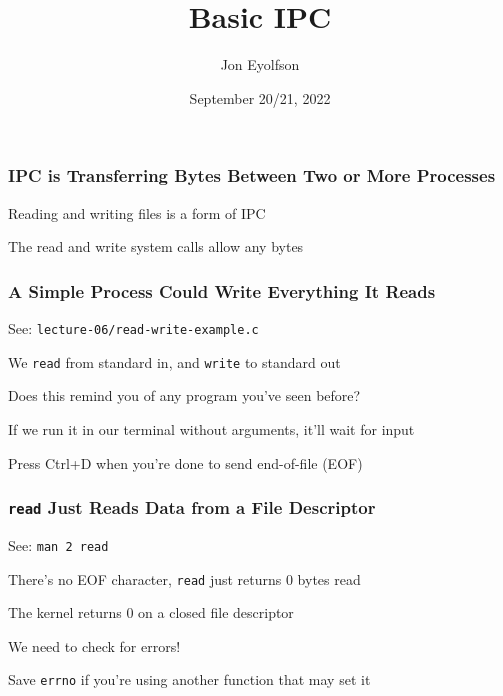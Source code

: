 

\title{Basic IPC}
\author{Jon Eyolfson}
\date{September 20/21, 2022}


  \begin{frame}
    \titlepage
  \end{frame}

  \begin{frame}
    \frametitle{IPC is Transferring Bytes Between Two or More Processes}

    Reading and writing files is a form of IPC

    \vspace{2em}

    The read and write system calls allow any bytes
  \end{frame}

  \begin{frame}
    \frametitle{A Simple Process Could Write Everything It Reads}

    See: \texttt{lecture-06/read-write-example.c}

    \vspace{2em}

    We \texttt{read} from standard in, and \texttt{write} to standard out

    \hspace{2em} Does this remind you of any program you've seen before?

    \vspace{2em}

    If we run it in our terminal without arguments, it'll wait for input

    \hspace{2em} Press Ctrl+D when you're done to send end-of-file (EOF)
  \end{frame}

  \begin{frame}
    \frametitle{\texttt{read} Just Reads Data from a File Descriptor}

    See: \texttt{man 2 read}

    \vspace{2em}

    There's no EOF character, \texttt{read} just returns 0 bytes read

    \hspace{2em} The kernel returns 0 on a closed file descriptor

    \vspace{2em}

    We need to check for errors!

    \hspace{2em} Save \texttt{errno} if you're using another function that may
                 set it
  \end{frame}


